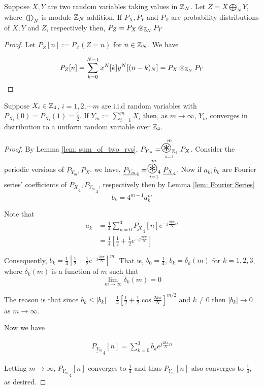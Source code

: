 \begin{lem}\label{lem: sum_of_two_rvs}
Suppose $X,Y$ are two random variables taking values in $\mathbb{Z}_N$. Let $Z=X\bigoplus_NY$, where $\bigoplus_N$ is module $\mathbb{Z}_N$ addition. If $P_X,P_Y$ and $P_Z$ are probability distributions of $X,Y$ and $Z$, respectively then, $P_Z=P_X\circledast_{\mathbb{Z}_N}P_Y$
\end{lem}

\begin{proof}
Let $P_Z[n]:=P_Z(Z=n)$ for $n\in \mathbb{Z}_N$. We have

\begin{equation*}
P_Z[n]=\sum_{k=0}^{N-1} x^N[k]y^N[(n-k)_N]=P_X\circledast_{\mathbb{Z}_N}P_Y
\end{equation*}
\end{proof}

\begin{lem}
Suppose $X_i\in \mathbb{Z}_4$, $i=1,2,\cdots m$ are i.i.d random variables with $P_{X_i}(0)=P_{X_i}(1)=\frac{1}{2}$. If $Y_m:=\sum_{i=1}^m X_i$ then, as $m\rightarrow \infty$, $Y_m$ converges in distribution to a uniform random variable over $\mathbb{Z}_4$.
\end{lem}

\begin{proof}
By Lemma \ref{lem: sum_of_two_rvs}, $P_{Y_m}= \stackrel{m}{\underset{i=1}{\Scale[2]{\circledast}_{\ZZ_4}}} P_X$. Consider the  periodic versions of $P_{Y_m}, P_X$. we have, $\underline{P_{Y_{m}}}_4= \stackrel{m}{\underset{i=1}{\Scale[2]{\circledast}_{4}}} \underline{P_{X}}_{4}$. Now if $a_k, b_k$ are Fourier series' coefficients of $\underline{P_{X}}_{4},\underline{P_{Y_{m}}}_4$, respectively then by Lemma \ref{lem: Fourier Series}
\begin{equation*}
b_k=4^{m-1}a_k^m
\end{equation*} 

Note that 
\begin{align*}
a_k&=\frac{1}{4}\sum_{n=0}^3 \underline{P_{X}}_{4}[n] e^{-j\frac{2k\pi}{N}n}\\
&=\frac{1}{4}[\frac{1}{2}+\frac{1}{2}e^{-j\frac{2k\pi}{N}}]
\end{align*}

Consequently, $b_k=\frac{1}{4}[\frac{1}{2}+\frac{1}{2}e^{-j\frac{2k\pi}{N}}]^m$. That is, $b_0=\frac{1}{4}$, $b_k=\delta_k(m)$ for $k=1,2,3$, where $\delta_k(m)$ is a function of $m$ such that 
$$\lim_{m\rightarrow \infty}\delta_k(m)=0$$

The reason is that since $b_k\leq |b_k|=\frac{1}{4}[\frac{1}{2}+\frac{1}{2}\cos{\frac{2k\pi}{N}}]^{m/2}$ and $k\neq 0$ then $|b_k|\rightarrow 0$ as $m\rightarrow \infty$.

Now we have

\begin{align*}
\underline{P_{Y_{m}}}_4[n]=\sum_{k=0}^3 b_k e^{j\frac{2k\pi}{N}n}
\end{align*}

Letting $m\rightarrow \infty$, $\underline{P_{Y_{m}}}_4[n]$ converges to $\frac{1}{4}$ and thus $P_{Y_{m}}[n]$ also converges to $\frac{1}{4}$, as desired.

\end{proof}


